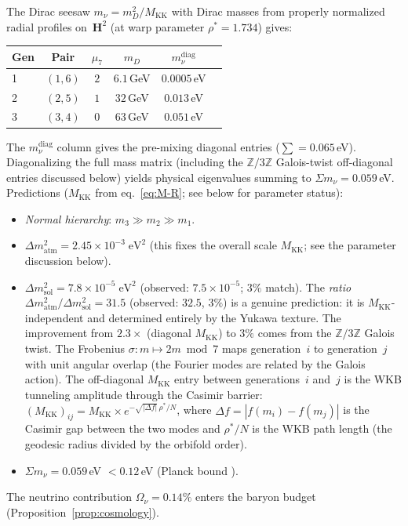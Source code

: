 The Dirac seesaw $m_\nu = m_D^2/M_{\mathrm{KK}}$ with Dirac masses
from properly normalized radial profiles on~$\mathbf{H}^2$
(at warp parameter $\rho^* = 1.734$) gives:
\begin{center}
\small
\begin{tabular}{lccccc}
\toprule
Gen & Pair & $\mu_7$ & $m_D$ & $m_\nu^{\mathrm{diag}}$ \\
\midrule
1 & $(1,6)$ & $2$ & $6.1$\,GeV & $0.0005$\,eV \\
2 & $(2,5)$ & $1$ & $32$\,GeV & $0.013$\,eV \\
3 & $(3,4)$ & $0$ & $63$\,GeV & $0.051$\,eV \\
\bottomrule
\end{tabular}
\end{center}
\noindent
The $m_\nu^{\mathrm{diag}}$ column gives the pre-mixing diagonal
entries ($\sum = 0.065$\,eV).
Diagonalizing the full mass matrix (including the
$\mathbb{Z}/3\mathbb{Z}$ Galois-twist off-diagonal entries
discussed below) yields physical eigenvalues summing to
$\Sigma m_\nu = 0.059$\,eV.
\noindent
Predictions ($M_{\mathrm{KK}}$ from eq.~\eqref{eq:M-R}; see below for
parameter status):
\begin{itemize}
\item \emph{Normal hierarchy}: $m_3 \gg m_2 \gg m_1$.\quad\checkmark
\item $\Delta m^2_{\mathrm{atm}} = 2.45 \times 10^{-3}\;\mathrm{eV}^2$
  (this fixes the overall scale $M_{\mathrm{KK}}$; see the parameter
  discussion below).
\item $\Delta m^2_{\mathrm{sol}} = 7.8 \times 10^{-5}\;\mathrm{eV}^2$
  (observed: $7.5 \times 10^{-5}$; $3\%$ match).
  The \emph{ratio} $\Delta m^2_{\mathrm{atm}}/\Delta m^2_{\mathrm{sol}}
  = 31.5$ (observed: $32.5$, $3\%$) is a genuine prediction:
  it is $M_{\mathrm{KK}}$-independent and determined entirely by the Yukawa texture.
  The improvement from $2.3\times$ (diagonal $M_{\mathrm{KK}}$) to $3\%$
  comes from the $\mathbb{Z}/3\mathbb{Z}$ Galois twist.
  The Frobenius $\sigma\colon m \mapsto 2m \bmod 7$
  maps generation~$i$ to generation~$j$ with unit angular overlap
  (the Fourier modes are related by the Galois action).
  The off-diagonal $M_{\mathrm{KK}}$ entry between generations~$i$
  and~$j$ is the WKB tunneling amplitude through the Casimir barrier:
  $(M_{\mathrm{KK}})_{ij} = M_{\mathrm{KK}} \times
  e^{-\sqrt{|\Delta f|}\,\rho^*/N}$,
  where $\Delta f = |f(m_i) - f(m_j)|$ is the Casimir gap
  between the two modes and $\rho^*/N$ is the WKB path length
  (the geodesic radius divided by the orbifold order).
\item $\Sigma m_\nu = 0.059$\,eV
  $< 0.12$\,eV (Planck bound \citep{Planck2018}).\quad\checkmark
\end{itemize}
The neutrino contribution $\Omega_\nu = 0.14\%$ enters
the baryon budget (Proposition~\ref{prop:cosmology}).

